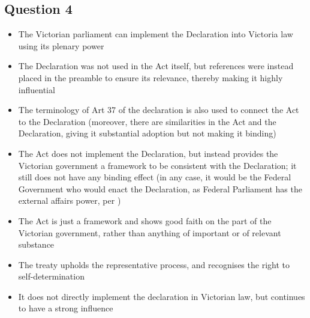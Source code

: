 \subsection*{Question 4}
\begin{itemize}
    \item The Victorian parliament can implement the Declaration into Victoria law using its plenary power
    \item The Declaration was not used in the Act itself, but references were instead placed in the preamble to ensure its relevance, thereby making it highly influential
    \item The terminology of Art 37 of the declaration is also used to connect the Act to the Declaration (moreover, there are similarities in the Act and the Declaration, giving it substantial adoption but not making it binding)
    \item The Act does not implement the Declaration, but instead provides the Victorian government a framework to be consistent with the Declaration; it still does not have any binding effect (in any case, it would be the Federal Government who would enact the Declaration, as Federal Parliament has the external affairs power, per )
    \item The Act is just a framework and shows good faith on the part of the Victorian government, rather than anything of important or of relevant substance
    \item The treaty upholds the representative process, and recognises the right to self-determination
    \item It does not directly implement the declaration in Victorian law, but continues to have a strong influence
\end{itemize}


